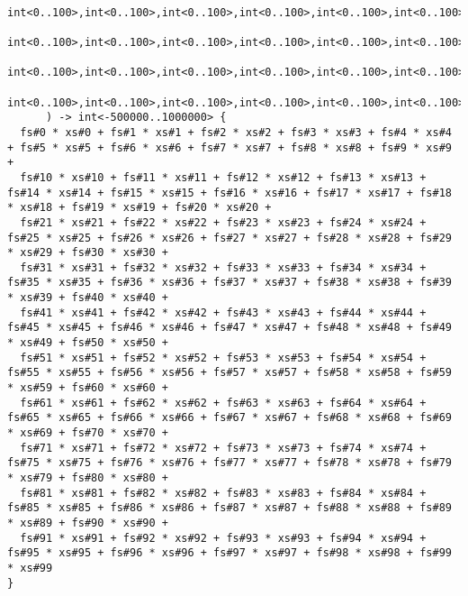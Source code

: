 \begin{verbatim}
            int<0..100>,int<0..100>,int<0..100>,int<0..100>,int<0..100>,int<0..100>,int<0..100>,int<0..100>,int<0..100>,int<0..100>,
            int<0..100>,int<0..100>,int<0..100>,int<0..100>,int<0..100>,int<0..100>,int<0..100>,int<0..100>,int<0..100>,int<0..100>,
            int<0..100>,int<0..100>,int<0..100>,int<0..100>,int<0..100>,int<0..100>,int<0..100>,int<0..100>,int<0..100>,int<0..100>,
            int<0..100>,int<0..100>,int<0..100>,int<0..100>,int<0..100>,int<0..100>,int<0..100>,int<0..100>,int<0..100>,int<0..100>)
      ) -> int<-500000..1000000> {
  fs#0 * xs#0 + fs#1 * xs#1 + fs#2 * xs#2 + fs#3 * xs#3 + fs#4 * xs#4 + fs#5 * xs#5 + fs#6 * xs#6 + fs#7 * xs#7 + fs#8 * xs#8 + fs#9 * xs#9 + 
  fs#10 * xs#10 + fs#11 * xs#11 + fs#12 * xs#12 + fs#13 * xs#13 + fs#14 * xs#14 + fs#15 * xs#15 + fs#16 * xs#16 + fs#17 * xs#17 + fs#18 * xs#18 + fs#19 * xs#19 + fs#20 * xs#20 + 
  fs#21 * xs#21 + fs#22 * xs#22 + fs#23 * xs#23 + fs#24 * xs#24 + fs#25 * xs#25 + fs#26 * xs#26 + fs#27 * xs#27 + fs#28 * xs#28 + fs#29 * xs#29 + fs#30 * xs#30 +
  fs#31 * xs#31 + fs#32 * xs#32 + fs#33 * xs#33 + fs#34 * xs#34 + fs#35 * xs#35 + fs#36 * xs#36 + fs#37 * xs#37 + fs#38 * xs#38 + fs#39 * xs#39 + fs#40 * xs#40 +
  fs#41 * xs#41 + fs#42 * xs#42 + fs#43 * xs#43 + fs#44 * xs#44 + fs#45 * xs#45 + fs#46 * xs#46 + fs#47 * xs#47 + fs#48 * xs#48 + fs#49 * xs#49 + fs#50 * xs#50 +
  fs#51 * xs#51 + fs#52 * xs#52 + fs#53 * xs#53 + fs#54 * xs#54 + fs#55 * xs#55 + fs#56 * xs#56 + fs#57 * xs#57 + fs#58 * xs#58 + fs#59 * xs#59 + fs#60 * xs#60 +
  fs#61 * xs#61 + fs#62 * xs#62 + fs#63 * xs#63 + fs#64 * xs#64 + fs#65 * xs#65 + fs#66 * xs#66 + fs#67 * xs#67 + fs#68 * xs#68 + fs#69 * xs#69 + fs#70 * xs#70 +
  fs#71 * xs#71 + fs#72 * xs#72 + fs#73 * xs#73 + fs#74 * xs#74 + fs#75 * xs#75 + fs#76 * xs#76 + fs#77 * xs#77 + fs#78 * xs#78 + fs#79 * xs#79 + fs#80 * xs#80 +
  fs#81 * xs#81 + fs#82 * xs#82 + fs#83 * xs#83 + fs#84 * xs#84 + fs#85 * xs#85 + fs#86 * xs#86 + fs#87 * xs#87 + fs#88 * xs#88 + fs#89 * xs#89 + fs#90 * xs#90 +
  fs#91 * xs#91 + fs#92 * xs#92 + fs#93 * xs#93 + fs#94 * xs#94 + fs#95 * xs#95 + fs#96 * xs#96 + fs#97 * xs#97 + fs#98 * xs#98 + fs#99 * xs#99
}


\end{verbatim}
